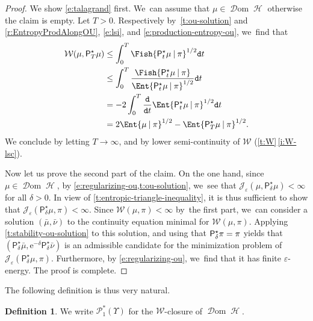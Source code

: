 \documentclass[10pt]{amsart}
\theoremstyle{definition}
\newtheorem{definition}[theorem]{Definition}
\theoremstyle{remark}
\newcommand{\given}[1][]{%
\nonscript\:#1\vert
\allowbreak
\nonscript\:
\mathopen{}}
\DeclareMathOperator{\ent}{\mathcal{H}}
\DeclareMathOperator{\dom}{\mathscr{D}om}
\begin{document}
\begin{proof}
We show \cref{e:talagrand} first. We~can assume that $\mu \in \dom \ent$ otherwise the claim is empty.
Let $T > 0$.
Respectively by~\cref{t:ou-solution} and \cref{r:EntropyProdAlongOU}, \cref{e:lsi}, and \cref{e:production-entropy-ou}, we~find that
\begin{equation*}
\begin{split}
\mathcal{W}(\mu, \mathsf{P}_{T}^{\star} \mu) &\leq \int_{0}^{T} \Fish{ \mathsf{P}_{t}^{\star} \mu \given \pi }^{1/2} \mathtt{d} t \\
& \leq \int_{0}^{T} \frac{\Fish{ \mathsf{P}^{\star}_{t} \mu \given \pi }}{\Ent{\mathsf{P}^{\star}_{t} \mu \given \pi }^{1/2}} \mathtt{d} t
\\
& = - 2\int_{0}^{T} \frac{\mathtt{d}}{\mathtt{d} t} \Ent{ \mathsf{P}_{t}^{\star} \mu \given \pi }^{1/2} \mathtt{d} t \\
&= 2\Ent{ \mu \given \pi }^{1/2} - \Ent{ \mathsf{P}_{T}^{\star} \mu \given \pi }^{1/2}.
\end{split}
\end{equation*}
We conclude by letting $T \to \infty$, and by lower semi-continuity of $\mathcal{W}$ (\cref{t:W}\,\cref{i:W-lsc}).

Now let us prove the second part of the claim.
On the one hand, since $\mu \in \dom \ent$, by \cref{e:regularizing-ou,t:ou-solution}, we~see that $\mathscr{J}_{\varepsilon}(\mu, \mathsf{P}_{\delta}^{\star} \mu) < \infty$ for all $\delta > 0$.
In view of \cref{t:entropic-triangle-inequality}, it is thus sufficient to show that $\mathscr{J}_{\varepsilon}(\mathsf{P}_{\delta}^{\star}\mu, \pi) \!<\! \infty$.
Since $\mathcal{W}(\mu, \pi) \!<\! \infty$ by~the first part, we~can consider a solution $(\bar{\mu}, \bar{\nu})$ to the continuity equation minimal for $\mathcal{W}(\mu, \pi)$.
Applying \cref{t:stability-ou-solution} to this solution, and using that $\mathsf{P}_{\delta}^{\star} \pi =\nobreak \pi$ yields that $(\mathsf{P}_{\delta}^{\star}\bar{\mu}, \mathrm{e}^{-\delta}\mathsf{P}_{\delta}^{\star} \bar{\nu})$ is an admissible candidate for the minimization problem of $\mathscr{J}_{\varepsilon}(\mathsf{P}_{\delta}^{\star}\mu, \pi)$.
Furthermore, by \cref{e:regularizing-ou}, we~find that it has finite $\varepsilon$-energy.
The proof is complete.
\end{proof}

The following definition is thus very natural.
\begin{definition}
We write $\mathscr{P}_{1}^{*}(\varUpsilon)$ for the $\mathcal{W}$-closure of $\dom \ent$.
\end{definition}
\end{document}
